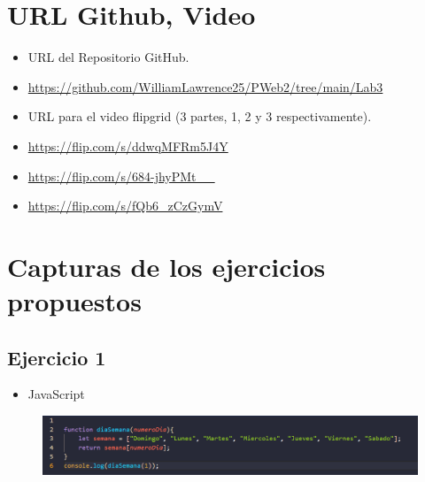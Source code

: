 \documentclass{article}
\begin{document}
	\section{URL Github, Video}
	\begin{itemize}
		\item URL del Repositorio GitHub.
		\item \url{https://github.com/WilliamLawrence25/PWeb2/tree/main/Lab3}
		\item URL para el video flipgrid (3 partes, 1, 2 y 3 respectivamente).
		\item \url{https://flip.com/s/ddwqMFRm5J4Y}	
		\item \url{https://flip.com/s/684-jhyPMt__}
		\item \url{https://flip.com/s/fQb6_zCzGymV}
	\end{itemize}
	\clearpage	
	
	\section{Capturas de los ejercicios propuestos}
	
	\subsection{Ejercicio 1}
	\begin{itemize}
		\item JavaScript
	\end{itemize}
	\begin{figure}[H]
		\centering
		\includegraphics[width=1.0\textwidth, keepaspectratio]{img/ejercicio1b}
	\end{figure}
	
\end{document}
